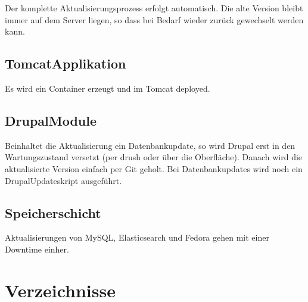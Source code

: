 \documentclass[letterpaper,10pt,english]{sphinxmanual}
\begin{document}
\sphinxAtStartPar
Der komplette Aktualisierungsprozess erfolgt automatisch. Die alte
Version bleibt immer auf dem Server liegen, so dass bei Bedarf wieder
zurück gewechselt werden kann.


\subsection{Tomcat\sphinxhyphen{}Applikation}
\label{\detokenize{toscience:tomcat-applikation}}\label{\detokenize{toscience:id65}}
\sphinxAtStartPar
Es wird ein \sphinxhyphen{}Container erzeugt und im Tomcat \sphinxhyphen{}deployed.


\subsection{Drupal\sphinxhyphen{}Module}
\label{\detokenize{toscience:drupal-module}}\label{\detokenize{toscience:id66}}
\sphinxAtStartPar
Beinhaltet die Aktualisierung ein Datenbankupdate, so wird Drupal erst
in den Wartungszustand versetzt (per drush oder über die Oberfläche).
Danach wird die aktualisierte Version einfach per Git geholt. Bei
Datenbankupdates wird noch ein Drupal\sphinxhyphen{}Updateskript ausgeführt.


\subsection{Speicherschicht}
\label{\detokenize{toscience:speicherschicht}}\label{\detokenize{toscience:id67}}
\sphinxAtStartPar
Aktualisierungen von MySQL, Elasticsearch und Fedora gehen mit einer
Downtime einher.


\section{Verzeichnisse}
\label{\detokenize{toscience:verzeichnisse}}\label{\detokenize{toscience:id68}}
\end{document}
